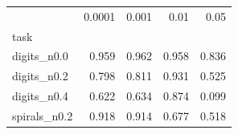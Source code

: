\begin{tabular}{lrrrr}
\toprule
 & 0.0001 & 0.001 & 0.01 & 0.05 \\
task &  &  &  &  \\
\midrule
digits\_n0.0 & 0.959 & 0.962 & 0.958 & 0.836 \\
digits\_n0.2 & 0.798 & 0.811 & 0.931 & 0.525 \\
digits\_n0.4 & 0.622 & 0.634 & 0.874 & 0.099 \\
spirals\_n0.2 & 0.918 & 0.914 & 0.677 & 0.518 \\
\bottomrule
\end{tabular}
